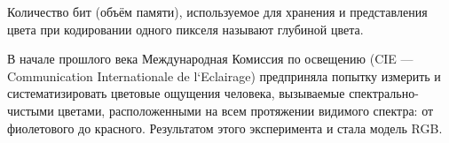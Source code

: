 \begin{figure}[ht!]
\end{figure}

Количество бит (объём памяти), используемое для хранения и представления цвета при кодировании одного пикселя называют глубиной цвета. 

В начале прошлого века Международная Комиссия по освещению (CIE —
Communication Internationale de l`Eclairage) предприняла попытку  измерить и систематизировать цветовые ощущения человека, вызываемые спектрально-чистыми
цветами, расположенными на всем протяжении видимого спектра: от фиолетового до
красного. Результатом этого эксперимента и стала модель RGB. 

\begin{figure}[ht!]
\end{figure}

